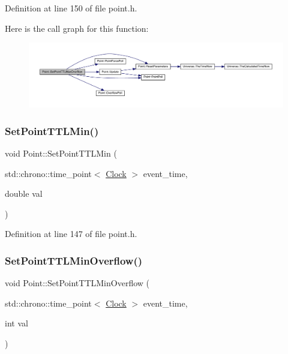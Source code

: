 Definition at line 150 of file point.\+h.

Here is the call graph for this function\+:
\nopagebreak
\begin{figure}[H]
\begin{center}
\leavevmode
\includegraphics[width=350pt]{class_point_a6a7ca43c551232d5c5d0f5a5d8603c9e_cgraph}
\end{center}
\end{figure}
\mbox{\label{class_point_ae36f75ff4e27742000acd8cad7743614}} 
\subsubsection{\texorpdfstring{Set\+Point\+T\+T\+L\+Min()}{SetPointTTLMin()}}
{\footnotesize\ttfamily void Point\+::\+Set\+Point\+T\+T\+L\+Min (\begin{DoxyParamCaption}\item[{std\+::chrono\+::time\+\_\+point$<$ \hyperlink{universe_8h_a0ef8d951d1ca5ab3cfaf7ab4c7a6fd80}{Clock} $>$}]{event\+\_\+time,  }\item[{double}]{val }\end{DoxyParamCaption})\hspace{0.3cm}{\ttfamily [inline]}}



Definition at line 147 of file point.\+h.

\mbox{\label{class_point_a167884648fa6ce217472edfdbf515ac3}} 
\subsubsection{\texorpdfstring{Set\+Point\+T\+T\+L\+Min\+Overflow()}{SetPointTTLMinOverflow()}}
{\footnotesize\ttfamily void Point\+::\+Set\+Point\+T\+T\+L\+Min\+Overflow (\begin{DoxyParamCaption}\item[{std\+::chrono\+::time\+\_\+point$<$ \hyperlink{universe_8h_a0ef8d951d1ca5ab3cfaf7ab4c7a6fd80}{Clock} $>$}]{event\+\_\+time,  }\item[{int}]{val }\end{DoxyParamCaption})\hspace{0.3cm}{\ttfamily [inline]}}



